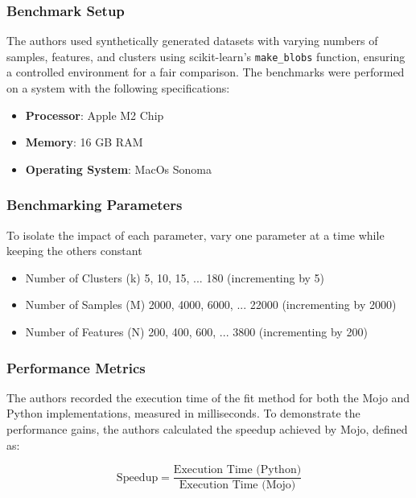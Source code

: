 \documentclass[conference]{IEEEtran}
\begin{document}
\subsubsection{Benchmark Setup}
The authors used synthetically generated datasets with varying numbers of samples, features, and clusters using scikit-learn's \texttt{make\_blobs} function, ensuring a controlled environment for a fair comparison. The benchmarks were performed on a system with the following specifications:  

\begin{itemize}
    \item \textbf{Processor}: Apple M2 Chip
    \item \textbf{Memory}: 16 GB RAM
    \item \textbf{Operating System}: MacOs Sonoma
\end{itemize}

\subsubsection{Benchmarking Parameters}
To isolate the impact of each parameter, vary one parameter at a time while keeping the others constant

\begin{itemize}
    \item Number of Clusters (k)   5, 10, 15, ... 180 (incrementing by 5)
    \item Number of Samples (M)   2000, 4000, 6000, ... 22000 (incrementing by 2000)
    \item Number of Features (N)   200, 400, 600, ... 3800 (incrementing by 200)
\end{itemize}

\subsubsection{Performance Metrics}
The authors recorded the execution time of the fit method for both the Mojo and Python implementations, measured in milliseconds. To demonstrate the performance gains, the authors calculated the speedup achieved by Mojo, defined as:

\[
\text{{Speedup}} = \frac{{\text{{Execution Time (Python)}}}}{{\text{{Execution Time (Mojo)}}}}
\]
\end{document}
